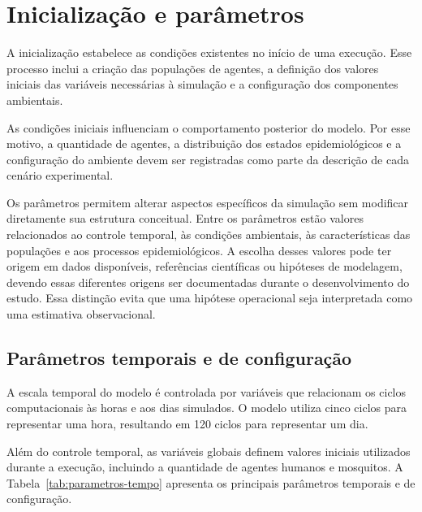 \section{Inicialização e parâmetros}

A inicialização estabelece as condições existentes no início de uma execução. Esse processo inclui a criação das populações de agentes, a definição dos valores iniciais das variáveis necessárias à simulação e a configuração dos componentes ambientais.

As condições iniciais influenciam o comportamento posterior do modelo. Por esse motivo, a quantidade de agentes, a distribuição dos estados epidemiológicos e a configuração do ambiente devem ser registradas como parte da descrição de cada cenário experimental.

Os parâmetros permitem alterar aspectos específicos da simulação sem modificar diretamente sua estrutura conceitual. Entre os parâmetros estão valores relacionados ao controle temporal, às condições ambientais, às características das populações e aos processos epidemiológicos. A escolha desses valores pode ter origem em dados disponíveis, referências científicas ou hipóteses de modelagem, devendo essas diferentes origens ser documentadas durante o desenvolvimento do estudo. Essa distinção evita que uma hipótese operacional seja interpretada como uma estimativa observacional.

\subsection{Parâmetros temporais e de configuração}

A escala temporal do modelo é controlada por variáveis que relacionam os ciclos computacionais às horas e aos dias simulados. O modelo utiliza cinco ciclos para representar uma hora, resultando em 120 ciclos para representar um dia.

Além do controle temporal, as variáveis globais definem valores iniciais utilizados durante a execução, incluindo a quantidade de agentes humanos e mosquitos. A Tabela~\ref{tab:parametros-tempo} apresenta os principais parâmetros temporais e de configuração.

